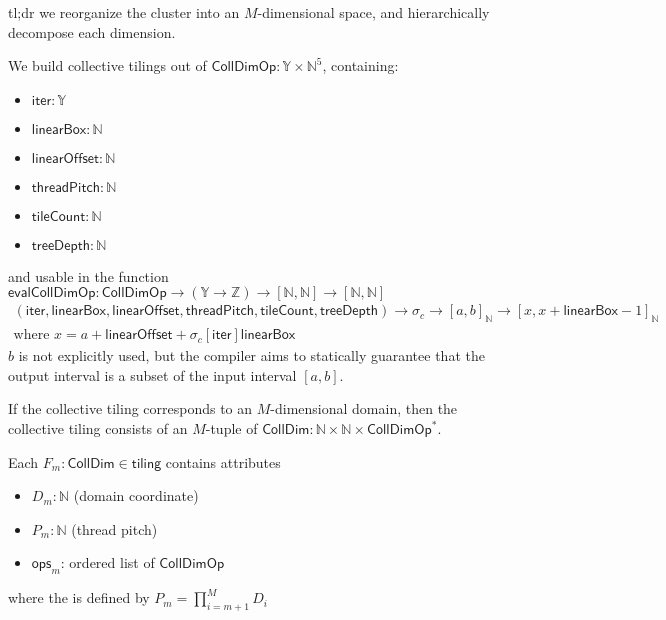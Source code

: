 \filbreak
{}

tl;dr we reorganize the cluster into an $M$-dimensional space, and hierarchically decompose each dimension.

We build collective tilings out of $\mathsf{CollDimOp}: \mathbb{Y} \times \mathbb{N}^5$, containing:
\begin{itemize}
  \item $\mathsf{iter}: \mathbb{Y}$
  \filbreak
  \item $\mathsf{linearBox}: \mathbb{N}$
  \filbreak
  \item $\mathsf{linearOffset}: \mathbb{N}$
  \filbreak
  \item $\mathsf{threadPitch}: \mathbb{N}$
  \filbreak
  \item $\mathsf{tileCount}: \mathbb{N}$
  \filbreak
  \item $\mathsf{treeDepth}: \mathbb{N}$
\end{itemize}
\filbreak
and usable in the function $\mathsf{evalCollDimOp}: \mathsf{CollDimOp} \to (\mathbb{Y} \to \mathbb{Z}) \to [\mathbb{N}, \mathbb{N}] \to [\mathbb{N}, \mathbb{N}]$
\begin{gather*}
    (\mathsf{iter}, \mathsf{linearBox}, \mathsf{linearOffset}, \mathsf{threadPitch}, \mathsf{tileCount}, \mathsf{treeDepth}) \to
    \sigma_c \to
    [a, b]_\mathbb{N} \to
    [x, x + \mathsf{linearBox} - 1]_\mathbb{N} \\
    \text{where } x = a + \mathsf{linearOffset} + \sigma_c[\mathsf{iter}] \mathsf{linearBox}
\end{gather*}
$b$ is not explicitly used, but the compiler aims to statically guarantee that the output interval is a subset of the input interval $[a, b]$.

\filbreak
If the collective tiling corresponds to an $M$-dimensional domain, then the collective tiling consists of an $M$-tuple of $\mathsf{CollDim}: \mathbb{N} \times \mathbb{N} \times \mathsf{CollDimOp}^*$.

\filbreak
Each $F_m : \mathsf{CollDim} \in \mathsf{tiling}$ contains attributes
\begin{itemize}
  \item $D_m: \mathbb{N}$ (domain coordinate)
  \filbreak
  \item $P_m: \mathbb{N}$ (thread pitch)
  \filbreak
  \item $\mathsf{ops}_m$: ordered list of $\mathsf{CollDimOp}$
\end{itemize}
where the  is defined by $P_m = \prod_{i = m+1}^M D_i$

